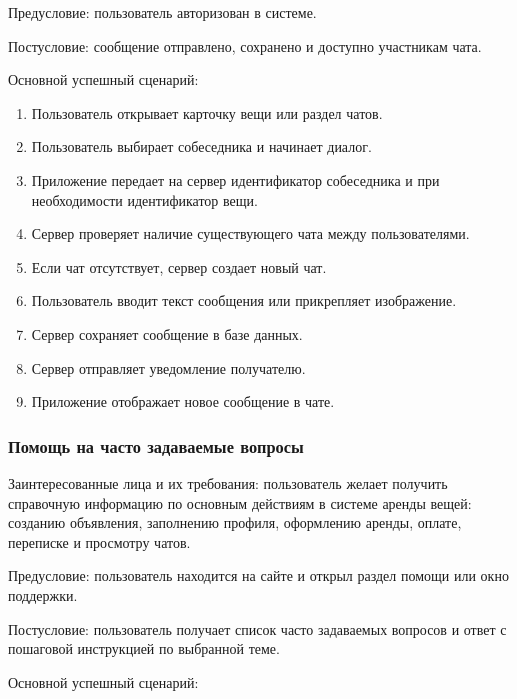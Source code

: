 Предусловие: пользователь авторизован в системе.

Постусловие: сообщение отправлено, сохранено и доступно участникам чата.

Основной успешный сценарий:
\begin{enumerate}
    \item Пользователь открывает карточку вещи или раздел чатов.
    \item Пользователь выбирает собеседника и начинает диалог.
    \item Приложение передает на сервер идентификатор собеседника и при необходимости идентификатор вещи.
    \item Сервер проверяет наличие существующего чата между пользователями.
    \item Если чат отсутствует, сервер создает новый чат.
    \item Пользователь вводит текст сообщения или прикрепляет изображение.
    \item Сервер сохраняет сообщение в базе данных.
    \item Сервер отправляет уведомление получателю.
    \item Приложение отображает новое сообщение в чате.
\end{enumerate}

\subsubsection{Помощь на часто задаваемые вопросы}

Заинтересованные лица и их требования: пользователь желает получить справочную информацию по основным действиям в системе аренды вещей: созданию объявления, заполнению профиля, оформлению аренды, оплате, переписке и просмотру чатов.

Предусловие: пользователь находится на сайте и открыл раздел помощи или окно поддержки.

Постусловие: пользователь получает список часто задаваемых вопросов и ответ с пошаговой инструкцией по выбранной теме.

Основной успешный сценарий:

